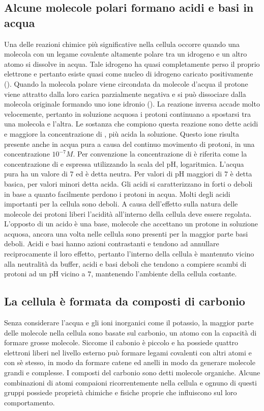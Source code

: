 \subsection{Alcune molecole polari formano acidi e basi in acqua}
Una delle reazioni chimice pi\`u significative nella cellula occorre quando una molecola con un legame covalente altamente polare tra un idrogeno e un altro atomo si dissolve in acqua.
Tale idrogeno ha quasi completamente perso il proprio elettrone e pertanto esiste quasi come nucleo di idrogeno caricato positivamente (). Quando la molecola polare viene 
circondata da molecole d'acqua il protone viene attratto dalla loro carica parzialmente negativa e si pu\`o dissociare dalla molecola originale formando uno ione idronio (). La 
reazione inversa accade molto velocemente, pertanto in soluzione acquosa i protoni continuano a spostarsi tra una molecola e l'altra. Le sostanza che compiono questa reazione sono dette 
acidi e maggiore la concentrazione di , pi\`u acida la soluzione. Questo ione risulta presente anche in acqua pura a causa del continuo movimento di protoni, in una 
concentrazione $10^{-7} M$. Per convenzione la concentrazione di  \`e riferita come la concentrazione di  e espressa utilizzando la scala del pH, logaritmica. L'acqua 
pura ha un valore di $7$ ed \`e detta neutra. Per valori di pH maggiori di $7$ \`e detta basica, per valori minori detta acida. Gli acidi si caratterizzano in forti o deboli in base a 
quanto facilmente perdono i protoni in acqua. Molti degli acidi importanti per la cellula sono deboli. A causa dell'effetto sulla natura delle molecole dei protoni liberi l'acidit\`a 
all'interno della cellula deve essere regolata. L'opposto di un acido \`e una base, molecole che accettano un protone in soluzione acquosa, ancora una volta nelle cellula sono presenti 
per la maggior parte basi deboli. Acidi e basi hanno azioni contrastanti e tendono ad annullare reciprocamente il loro effetto, pertanto l'interno della cellula \`e mantenuto vicino 
alla neutralit\`a da buffer, acidi e basi deboli che tendono a compiere scambi di protoni ad un pH vicino a $7$, mantenendo l'ambiente della cellula costante. 
\subsection{La cellula \`e formata da composti di carbonio}
Senza considerare l'acqua e gli ioni inorganici come il potassio, la maggior parte delle molecole nella cellula sono basate sul carbonio, un atomo con la capacit\`a di formare grosse
molecole. Siccome il cabonio \`e piccolo e ha possiede quattro elettroni liberi nel livello esterno pu\`o formare legami covalenti con altri atomi e con s\`e stesso, in modo da formare
catene ed anelli in modo da generare molecole grandi e complesse. I composti del carbonio sono detti molecole organiche. Alcune combinazioni di atomi compaioni ricorrentemente nella
cellula e ognuno di questi gruppi possiede propriet\`a chimiche e fisiche proprie che influiscono sul loro comportamento. 
